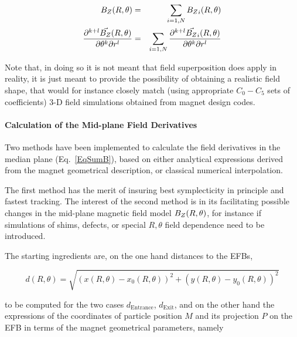 \begin{eqnarray}
\label{EqSumB}
{B_Z}(R,\theta) &=&  \sum_{i=1,N} {B_Z}_i(R,\theta)   \\
\dfrac{\partial^{ k+l}\vec {{B_Z}}(R,\theta) }{ \partial \theta^k\partial r^l} &=&  \sum_{i=1,N} 
\dfrac{\partial^{ k+l}\vec {{B_Z}}_i(R,\theta) }{ \partial \theta^k\partial r^l} 
\end{eqnarray}

\noindent  Note that, in doing so it is not meant that field superposition  does apply 
in reality, it is just meant to provide the possibility 
of obtaining a realistic  field shape, that would for instance closely match (using appropriate $C_0-C_5$ sets 
of coefficients) 3-D  field simulations obtained from magnet design codes. 


\bigskip




\paragraph{Calculation of the  Mid-plane Field Derivatives}

\noindent Two  methods have been implemented to calculate the field derivatives in the median 
plane (Eq.~\ref{EqSumB}), based on 
 either analytical expressions derived from the magnet geometrical description,  or  classical numerical interpolation. 
 
\noindent The first method has the merit of insuring best symplecticity in principle and fastest tracking. 
The interest of the second method is in its  facilitating possible  changes in 
  the mid-plane magnetic field model ${B_Z}(R,\theta)$, for instance if simulations of shims, defects, 
or special $R, \theta$  field dependence need to be introduced. 



\bigskip

\label{AnalMeth}

\bigskip

\noindent The  starting ingredients are, on the one hand distances to the EFBs,  

$$d(R,\theta)=\sqrt{(x(R,\theta)-x_{0}(R,\theta))^2+(y(R,\theta)-y_{0}(R,\theta))^2}$$

\noindent to be computed for the two cases $d_{\textrm{Entrance}}$, $d_{\textrm{Exit}}$, and 
on the other hand the expressions of the coordinates of particle position $M$ and its projection $P$ on 
the EFB in terms of the magnet geometrical parameters, namely 

